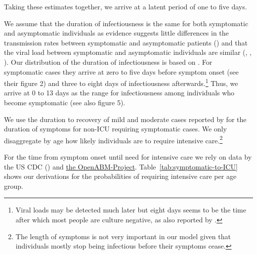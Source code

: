 Taking these estimates together, we arrive at a latent period of one to five days.


We assume that the duration of infectiousness is the same for both symptomatic and
asymptomatic individuals as evidence suggests little differences in the transmission
rates between symptomatic and asymptomatic patients (\citet{Yin2020}) and that the viral
load between symptomatic and asymptomatic individuals are similar (\citet{Zou2020},
\citet{Byrne2020}, \citet{Singanayagam2020}). Our distribution of the duration of
infectiousness is based on \citet{Byrne2020}. For symptomatic cases they arrive at zero
to five days before symptom onset (see their figure 2) and three to eight days of
infectiousness afterwards.\footnote{Viral loads may be detected much later but eight days
seems to be the time after which most people are culture negative, as also reported by
\citet{Singanayagam2020}.} Thus, we arrive at 0 to 13 days as the range for
infectiousness among individuals who become symptomatic (see also figure 5).


We use the duration to recovery of mild and moderate cases reported by \cite[Figure~S3,
Panel~2]{Bi2020} for the duration of symptoms for non-ICU requiring symptomatic cases. We
only disaggregate by age how likely individuals are to require intensive
care.\footnote{The length of symptoms is not very important in our model given that
individuals mostly stop being infectious before their symptoms cease.}


For the time from symptom onset until need for intensive care we rely on data by the US
CDC (\citet{Stokes2020}) and \href{https://bit.ly/3yKXFyu}{the OpenABM-Project}.
Table~\ref{tab:symptomatic-to-ICU} shows our derivations for the probabilities of
requiring intensive care per age group.

